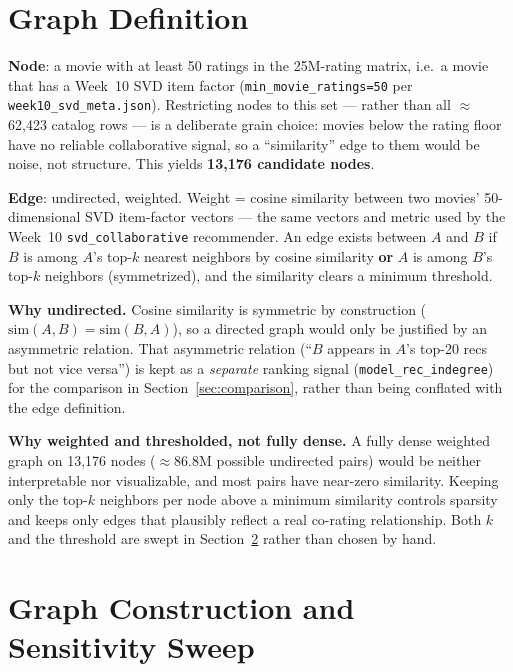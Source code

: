 \documentclass[12pt,a4paper]{article}
\begin{document}
\section{Graph Definition}

\textbf{Node}: a movie with at least 50 ratings in the 25M-rating matrix, i.e.\ a movie that has a
Week~10 SVD item factor (\texttt{min\_movie\_ratings=50} per \texttt{week10\_svd\_meta.json}).
Restricting nodes to this set --- rather than all $\approx$62,423 catalog rows --- is a deliberate
grain choice: movies below the rating floor have no reliable collaborative signal, so a
``similarity'' edge to them would be noise, not structure. This yields \textbf{13,176 candidate
nodes}.

\textbf{Edge}: undirected, weighted. Weight = cosine similarity between two movies' 50-dimensional
SVD item-factor vectors --- the same vectors and metric used by the Week~10
\texttt{svd\_collaborative} recommender. An edge exists between $A$ and $B$ if $B$ is among $A$'s
top-$k$ nearest neighbors by cosine similarity \textbf{or} $A$ is among $B$'s top-$k$ neighbors
(symmetrized), and the similarity clears a minimum threshold.

\textbf{Why undirected.} Cosine similarity is symmetric by construction ($\mathrm{sim}(A,B) =
\mathrm{sim}(B,A)$), so a directed graph would only be justified by an asymmetric relation. That
asymmetric relation (``$B$ appears in $A$'s top-20 recs but not vice versa'') is kept as a
\emph{separate} ranking signal (\texttt{model\_rec\_indegree}) for the comparison in
Section~\ref{sec:comparison}, rather than being conflated with the edge definition.

\textbf{Why weighted and thresholded, not fully dense.} A fully dense weighted graph on 13,176
nodes ($\approx$86.8M possible undirected pairs) would be neither interpretable nor visualizable,
and most pairs have near-zero similarity. Keeping only the top-$k$ neighbors per node above a
minimum similarity controls sparsity and keeps only edges that plausibly reflect a real co-rating
relationship. Both $k$ and the threshold are swept in Section~\ref{sec:sweep} rather than chosen by
hand.

\section{Graph Construction and Sensitivity Sweep}
\label{sec:sweep}
\end{document}
